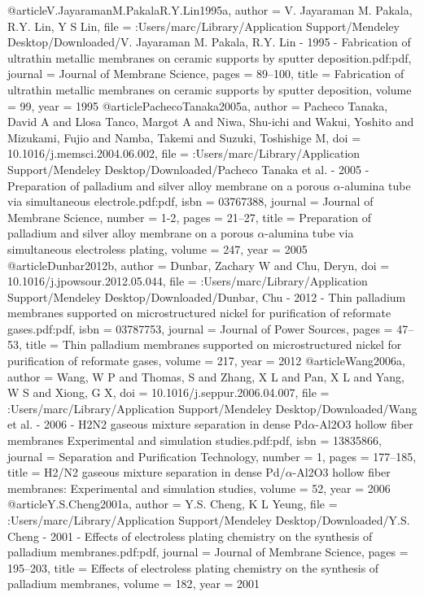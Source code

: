 @article{V.JayaramanM.PakalaR.Y.Lin1995a,
author = {{V. Jayaraman   M. Pakala, R.Y. Lin}, Y S Lin},
file = {:Users/marc/Library/Application Support/Mendeley Desktop/Downloaded/V. Jayaraman M. Pakala, R.Y. Lin - 1995 - Fabrication of ultrathin metallic membranes on ceramic supports by sputter deposition.pdf:pdf},
journal = {Journal of Membrane Science},
pages = {89--100},
title = {{Fabrication of ultrathin metallic membranes on ceramic supports by sputter deposition}},
volume = {99},
year = {1995}
}
@article{PachecoTanaka2005a,
author = {{Pacheco Tanaka}, David A and {Llosa Tanco}, Margot A and Niwa, Shu-ichi and Wakui, Yoshito and Mizukami, Fujio and Namba, Takemi and Suzuki, Toshishige M},
doi = {10.1016/j.memsci.2004.06.002},
file = {:Users/marc/Library/Application Support/Mendeley Desktop/Downloaded/Pacheco Tanaka et al. - 2005 - Preparation of palladium and silver alloy membrane on a porous $\alpha$-alumina tube via simultaneous electrole.pdf:pdf},
isbn = {03767388},
journal = {Journal of Membrane Science},
number = {1-2},
pages = {21--27},
title = {{Preparation of palladium and silver alloy membrane on a porous $\alpha$-alumina tube via simultaneous electroless plating}},
volume = {247},
year = {2005}
}
@article{Dunbar2012b,
author = {Dunbar, Zachary W and Chu, Deryn},
doi = {10.1016/j.jpowsour.2012.05.044},
file = {:Users/marc/Library/Application Support/Mendeley Desktop/Downloaded/Dunbar, Chu - 2012 - Thin palladium membranes supported on microstructured nickel for purification of reformate gases.pdf:pdf},
isbn = {03787753},
journal = {Journal of Power Sources},
pages = {47--53},
title = {{Thin palladium membranes supported on microstructured nickel for purification of reformate gases}},
volume = {217},
year = {2012}
}
@article{Wang2006a,
author = {Wang, W P and Thomas, S and Zhang, X L and Pan, X L and Yang, W S and Xiong, G X},
doi = {10.1016/j.seppur.2006.04.007},
file = {:Users/marc/Library/Application Support/Mendeley Desktop/Downloaded/Wang et al. - 2006 - H2N2 gaseous mixture separation in dense Pd$\alpha$-Al2O3 hollow fiber membranes Experimental and simulation studies.pdf:pdf},
isbn = {13835866},
journal = {Separation and Purification Technology},
number = {1},
pages = {177--185},
title = {{H2/N2 gaseous mixture separation in dense Pd/$\alpha$-Al2O3 hollow fiber membranes: Experimental and simulation studies}},
volume = {52},
year = {2006}
}
@article{Y.S.Cheng2001a,
author = {{Y.S. Cheng}, K L Yeung},
file = {:Users/marc/Library/Application Support/Mendeley Desktop/Downloaded/Y.S. Cheng - 2001 - Effects of electroless plating chemistry on the synthesis of palladium membranes.pdf:pdf},
journal = {Journal of Membrane Science},
pages = {195--203},
title = {{Effects of electroless plating chemistry on the synthesis of palladium membranes}},
volume = {182},
year = {2001}
}
